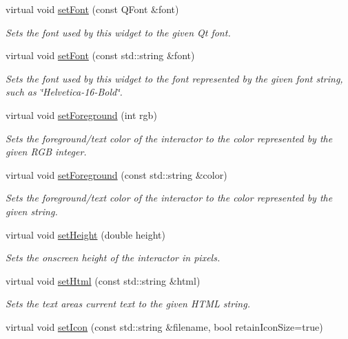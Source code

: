 \begin{DoxyCompactItemize}
virtual void \mbox{\hyperlink{classGInteractor_a2592348886ffea646c6534bf88f7c49d}{set\+Font}} (const Q\+Font \&font)
\begin{DoxyCompactList}\small\item\em Sets the font used by this widget to the given Qt font. \end{DoxyCompactList}\item 
virtual void \mbox{\hyperlink{classGInteractor_a8e096e8818d838aceae1d46d58fb3a7b}{set\+Font}} (const std\+::string \&font)
\begin{DoxyCompactList}\small\item\em Sets the font used by this widget to the font represented by the given font string, such as \char`\"{}\+Helvetica-\/16-\/\+Bold\char`\"{}. \end{DoxyCompactList}\item 
virtual void \mbox{\hyperlink{classGInteractor_a9eb856b5ff83a19df3831a31f15f4563}{set\+Foreground}} (int rgb)
\begin{DoxyCompactList}\small\item\em Sets the foreground/text color of the interactor to the color represented by the given R\+GB integer. \end{DoxyCompactList}\item 
virtual void \mbox{\hyperlink{classGInteractor_af59209aeadea6dfc6d97a2d8531f50e1}{set\+Foreground}} (const std\+::string \&color)
\begin{DoxyCompactList}\small\item\em Sets the foreground/text color of the interactor to the color represented by the given string. \end{DoxyCompactList}\item 
virtual void \mbox{\hyperlink{classGInteractor_a9e280bfc4544dfaf8e4376c4e1a74357}{set\+Height}} (double height)
\begin{DoxyCompactList}\small\item\em Sets the onscreen height of the interactor in pixels. \end{DoxyCompactList}\item 
virtual void \mbox{\hyperlink{classGTextArea_a71ca94fd0ab4223097c4d524ddafe94f}{set\+Html}} (const std\+::string \&html)
\begin{DoxyCompactList}\small\item\em Sets the text area\textquotesingle{}s current text to the given H\+T\+ML string. \end{DoxyCompactList}\item 
virtual void \mbox{\hyperlink{classGInteractor_a762e139aa311461c3984d3ad28293f64}{set\+Icon}} (const std\+::string \&filename, bool retain\+Icon\+Size=true)

\end{DoxyCompactItemize}
